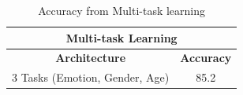 \begin{table}[]
\centering
\begin{tabular}{cc}
\hline
\multicolumn{2}{c}{\textbf{Multi-task Learning}}   \\ \hline
\textbf{Architecture}          & \textbf{Accuracy} \\ \hline
3 Tasks (Emotion, Gender, Age) & 85.2              \\ \hline
\end{tabular}
\caption{Accuracy from Multi-task learning}
\label{tab:multitask_learning}
\end{table}

